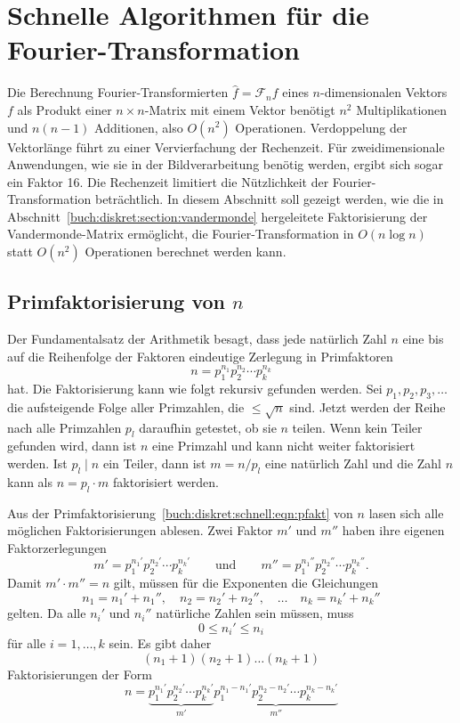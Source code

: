 %
%
%
\section{Schnelle Algorithmen für die Fourier-Transformation
\label{buch:diskret:section:schnell}}
Die Berechnung Fourier-Transformierten $\hat{f}=\mathscr{F}_nf$ eines
$n$-dimensionalen Vektors $f$ als Produkt einer $n\times n$-Matrix mit
einem Vektor benötigt $n^2$ Multiplikationen und $n(n-1)$ Additionen,
also $O(n^2)$ Operationen.
Verdoppelung der Vektorlänge führt zu einer Vervierfachung der Rechenzeit.
Für zweidimensionale Anwendungen, wie sie in der Bildverarbeitung
benötig werden, ergibt sich sogar ein Faktor 16.
Die Rechenzeit limitiert die Nützlichkeit der Fourier-Transformation
beträchtlich.
In diesem Abschnitt soll gezeigt werden, wie die in
Abschnitt~\ref{buch:diskret:section:vandermonde} hergeleitete
Faktorisierung der Vandermonde-Matrix ermöglicht, die Fourier-Transformation
in $O(n\log n)$ statt $O(n^2)$ Operationen berechnet werden kann.

%
%
\subsection{Primfaktorisierung von $n$
\label{buch:diskret:schnell:subsection:primfaktorisierung}}
Der Fundamentalsatz der Arithmetik besagt, dass jede natürlich Zahl $n$
eine bis auf die Reihenfolge der Faktoren eindeutige Zerlegung in
Primfaktoren
\begin{equation}
n = p_1^{n_1} p_2^{n_2} \cdots p_k^{n_k}
\label{buch:diskret:schnell:eqn:pfakt}
\end{equation}
hat.
Die Faktorisierung kann wie folgt rekursiv gefunden werden.
Sei $p_1,p_2,p_3,\dots$ die aufsteigende Folge aller Primzahlen, die
$\le \!\sqrt{n}$ sind.
Jetzt werden der Reihe nach alle Primzahlen $p_l$ daraufhin getestet,
ob sie $n$ teilen.
Wenn kein Teiler gefunden wird, dann ist $n$ eine Primzahl und kann
nicht weiter faktorisiert werden.
Ist $p_l\mid n$ ein Teiler, dann ist $m=n/p_l$ eine natürlich Zahl
und die Zahl $n$ kann als $n=p_l\cdot m$ faktorisiert werden.

Aus der Primfaktorisierung~\eqref{buch:diskret:schnell:eqn:pfakt}
von $n$ lasen sich alle möglichen Faktorisierungen ablesen.
Zwei Faktor $m'$ und $m''$ haben ihre eigenen Faktorzerlegungen
\[
m'= p_1^{n_1'}p_2^{n_2'}\cdots p_k^{n_k'}
\qquad\text{und}\qquad
m''= p_1^{n_1''}p_2^{n_2''}\cdots p_k^{n_k''}.
\]
Damit $m'\cdot m''=n$ gilt, müssen für die Exponenten die Gleichungen
\[
n_1=n_1'+n_1'',\quad
n_2=n_2'+n_2'',\quad\dots\quad
n_k=n_k'+n_k''
\]
gelten.
Da alle $n_i'$ und $n_i''$ natürliche Zahlen sein müssen, muss
\[
0\le n_i'\le n_i
\]
für alle $i=1,\dots,k$ sein.
Es gibt daher
\[
(n_1+1)(n_2+1)\dots(n_k+1)
\]
Faktorisierungen der Form
\[
n
=
\underbrace{
p_1^{n_1'}p_2^{n_2'}\cdots p_k^{n_k'}
}_{\displaystyle m'}
\underbrace{
p_1^{n_1-n_1'}p_2^{n_2-n_2'}\cdots p_k^{n_k-n_k'}
}_{\displaystyle m''}
\]

